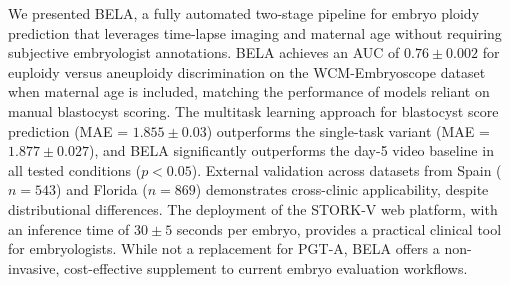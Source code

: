 \documentclass[12pt]{article}
\begin{document}
We presented BELA, a fully automated two-stage pipeline for embryo ploidy prediction that leverages time-lapse imaging and maternal age without requiring subjective embryologist annotations. BELA achieves an AUC of $0.76 \pm 0.002$ for euploidy versus aneuploidy discrimination on the WCM-Embryoscope dataset when maternal age is included, matching the performance of models reliant on manual blastocyst scoring. The multitask learning approach for blastocyst score prediction (MAE = $1.855 \pm 0.03$) outperforms the single-task variant (MAE = $1.877 \pm 0.027$), and BELA significantly outperforms the day-5 video baseline in all tested conditions ($p < 0.05$). External validation across datasets from Spain ($n = 543$) and Florida ($n = 869$) demonstrates cross-clinic applicability, despite distributional differences. The deployment of the STORK-V web platform, with an inference time of $30 \pm 5$ seconds per embryo, provides a practical clinical tool for embryologists. While not a replacement for PGT-A, BELA offers a non-invasive, cost-effective supplement to current embryo evaluation workflows.


\end{document}
